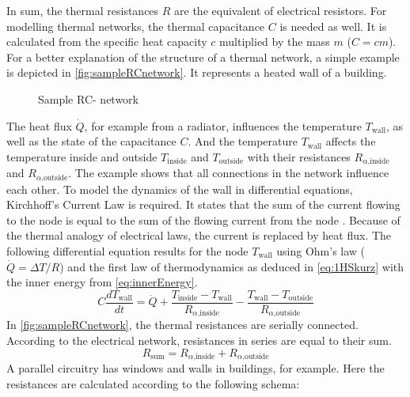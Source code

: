     In sum, the thermal resistances $R$ are the equivalent of electrical resistors.
    For modelling thermal networks, the thermal capacitance $C$ is needed as well. It is calculated from the specific heat capacity $c$ multiplied by the mass $m$ ($C=cm$).
    \newline
    For a better explanation of the structure of a thermal network, a simple example is depicted in \autoref{fig:sampleRCnetwork}. It represents a heated wall of a building.
    \begin{figure}[h]
    \centering
    \def\svgwidth{300pt}
    
    \caption{Sample RC- network}
    \label{fig:sampleRCnetwork}
    \end{figure}
    The heat flux $\dot{Q}$, for example from a radiator, influences the temperature $T_\text{wall}$, as well as the state of the capacitance $C$. And the temperature $T_\text{wall}$ affects the temperature inside and outside $T_\text{inside}$ and $T_\text{outside}$ with their resistances $R_{\alpha \text{,inside}}$ and $R_{\alpha \text{,outside}}$. The example shows that all connections in the network influence each other.
    To model the dynamics of the wall in differential equations, Kirchhoff's Current Law is required. It states that the sum of the current flowing to the node is equal to the sum of the flowing current from the node 
    \cite{Kuchling.2007}. 
    Because of the thermal analogy of electrical laws, the current is replaced by heat flux. The following differential equation results for the node  $T_\text{wall}$ using Ohm's law ($\dot{Q}=\Delta T/R$) and the first law of thermodynamics as deduced in \autoref{eq:1HSkurz} with the inner energy from \autoref{eq:innerEnergy}.     
    \begin{equation}
    \label{eq:sampledifferential}
    C \frac{d T_\text{wall}}{d t} = \dot{Q} + \frac{T_\text{inside}-T_\text{wall}}{R_{\alpha \text{,inside}}} - \frac{T_\text{wall}-T_\text{outside}}{R_{\alpha\text{,outside}}}
    \end{equation}
    In \autoref{fig:sampleRCnetwork}, the thermal resistances are serially connected. According to the electrical network, resistances in series are equal to their sum. 
    \begin{equation}
    \label{eq:resistanceseriel}
        R_\text{sum} = R_{\alpha \text{,inside}} + R_{\alpha \text{,outside}}
    \end{equation}
    A parallel circuitry has windows and walls in buildings, for example. Here the resistances are calculated according to the following schema:
